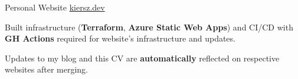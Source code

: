 \begin{cventries}
    \cventry
    {Personal Website}
    {\href{https://kiersz.dev/}{kiersz.dev}}
    {} %
    {} %
    {
        \begin{cvitems} 
        \item Built infrastructure (\textbf{Terraform}, \textbf{Azure Static Web Apps}) and CI/CD with \textbf{GH Actions} required for website's infrastructure and updates. 
        \item Updates to my blog and this CV are \textbf{automatically} reflected on respective websites after merging.
        \end{cvitems}
    }

\end{cventries}
